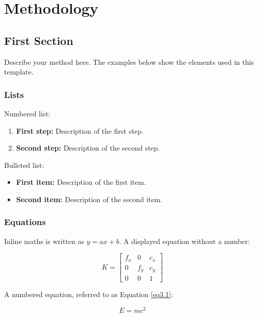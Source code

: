 
\chapter{Methodology}

\section{First Section}

Describe your method here. The examples below show the elements used in this template.

\subsection{Lists}

Numbered list:

\begin{enumerate}
    \item \textbf{First step:} Description of the first step.
    \item \textbf{Second step:} Description of the second step.
\end{enumerate}

Bulleted list:

\begin{itemize}
    \item \textbf{First item:} Description of the first item.
    \item \textbf{Second item:} Description of the second item.
\end{itemize}

\subsection{Equations}

Inline maths is written as \(y = ax + b\). A displayed equation without a number:

\[
K =
\begin{bmatrix}
f_x & 0 & c_x \\
0 & f_y & c_y \\
0 & 0 & 1
\end{bmatrix}
\]

A numbered equation, referred to as Equation \eqref{eq3.1}:

\begin{equation}
E = mc^2
\label{eq3.1}
\end{equation}

